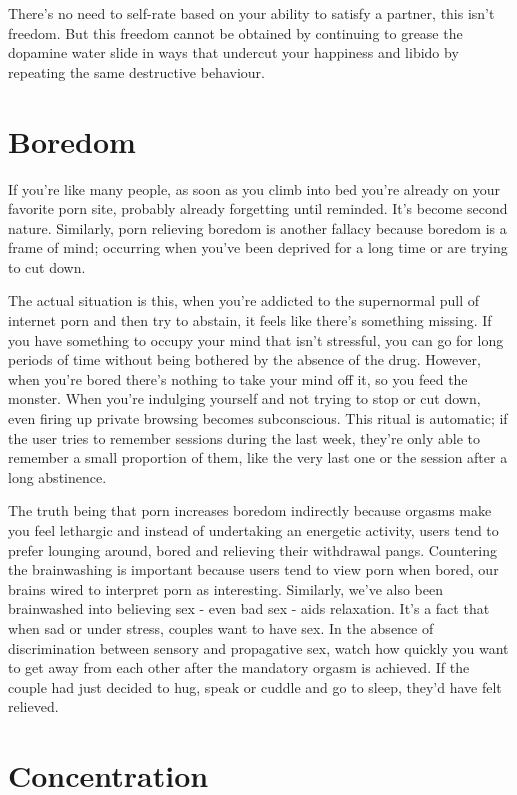 \documentclass[
]{book}
\begin{document}
There's no need to self-rate based on your ability to satisfy a partner, this isn't freedom. But this freedom cannot be obtained by continuing to grease the dopamine water slide in ways that undercut your happiness and libido by repeating the same destructive behaviour.

\hypertarget{boredom}{%
\section{Boredom}\label{boredom}}

If you're like many people, as soon as you climb into bed you're already on your favorite porn site, probably already forgetting until reminded. It's become second nature. Similarly, porn relieving boredom is another fallacy because boredom is a frame of mind; occurring when you've been deprived for a long time or are trying to cut down.

The actual situation is this, when you're addicted to the supernormal pull of internet porn and then try to abstain, it feels like there's something missing. If you have something to occupy your mind that isn't stressful, you can go for long periods of time without being bothered by the absence of the drug. However, when you're bored there's nothing to take your mind off it, so you feed the monster. When you're indulging yourself and not trying to stop or cut down, even firing up private browsing becomes subconscious. This ritual is automatic; if the user tries to remember sessions during the last week, they're only able to remember a small proportion of them, like the very last one or the session after a long abstinence.

The truth being that porn increases boredom indirectly because orgasms make you feel lethargic and instead of undertaking an energetic activity, users tend to prefer lounging around, bored and relieving their withdrawal pangs. Countering the brainwashing is important because users tend to view porn when bored, our brains wired to interpret porn as interesting. Similarly, we've also been brainwashed into believing sex - even bad sex - aids relaxation. It's a fact that when sad or under stress, couples want to have sex. In the absence of discrimination between sensory and propagative sex, watch how quickly you want to get away from each other after the mandatory orgasm is achieved. If the couple had just decided to hug, speak or cuddle and go to sleep, they'd have felt relieved.

\hypertarget{concentration}{%
\section{Concentration}\label{concentration}}
\end{document}
